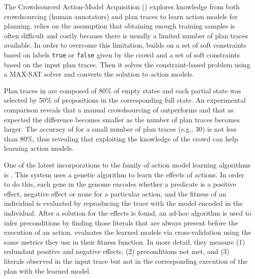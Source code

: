 The Crowdsourced Action-Model Acquisition (\textbf{\CAMA}) \cite{Zhuo15} explores knowledge from both crowdsourcing (human annotators) and plan traces to learn action models for planning. \CAMA relies on the assumption that obtaining enough training samples is often difficult and costly because there is usually a limited number of plan traces available. In order to overcome this limitation, \CAMA builds on a set of soft constraints based on labels \texttt{true} or \texttt{false} given by the crowd and a set of soft constraints based on the input plan traces. Then it solves the constraint-based problem using a MAX-SAT solver and converts the solution to action models.

Plan traces in \CAMA are composed of 80\% of empty states and each partial state was selected by 50\% of propositions in the corresponding full state. An experimental comparison reveals that a manual crowdsourcing of \CAMA outperforms \ARMS and that as expected the difference becomes smaller as the number of plan traces becomes larger. The accuracy of \CAMA for a small number of plan traces (e.g., 30) is not less than 80\%, thus revealing that exploiting the knowledge of the crowd can help learning action models.


\textcolor[rgb]{1.00,0.00,0.00}{One of the latest incorporations to the family of action model learning algorithms is \LOUGA. This system uses a genetic algorithm to learn the effects of actions. In order to do this, each gene in the genome encodes whether a predicate is a positive effect, negative effect or none for a particular action, and the fitness of an individual is evaluated by reproducing the trace with the model encoded in the individual. After a solution for the effects is found, an ad-hoc algorithm is used to infer preconditions by finding those literals that are always present before the execution of an action. \LOUGA evaluates the learned models via cross-validation using the same metrics they use in their fitness function. In more detail, they measure (1) redundant positive and negative effects, (2) preconditions not met, and (3) literals observed in the input trace but not in the corresponding execution of the plan with the learned model.}

